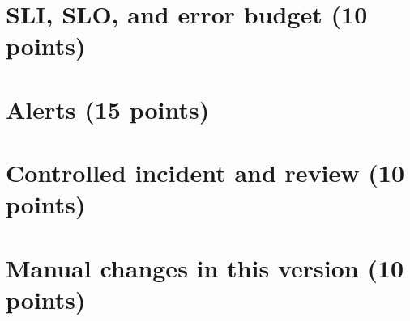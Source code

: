 \section{SLI, SLO, and error budget (10 points)}\label{Section:sreSlo}

\section{Alerts (15 points)}\label{Section:sreAlerts}

\section{Controlled incident and review (10 points)}\label{Section:sreIncident}

\section{Manual changes in this version (10 points)}\label{Section:sreManual}
